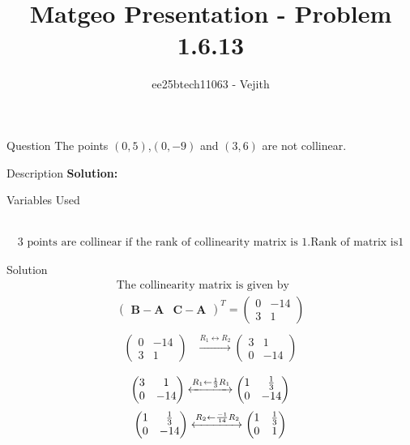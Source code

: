 \documentclass{beamer}
\title{Matgeo Presentation - Problem 1.6.13}
\author{ee25btech11063 - Vejith}
\numberwithin{equation}{section}
\providecommand{\brak}[1]{\ensuremath{\left(#1\right)}}
\theoremstyle{remark}
\newcommand{\myvec}[1]{\ensuremath{\begin{pmatrix}#1\end{pmatrix}}}
\let\vec\mathbf
\begin{document}
\frame{\titlepage}
\begin{frame}{Question}
The points $\brak{0,5}$,$\brak{0,-9}$ and $\brak{3,6}$ are  not collinear.
\end{frame}

\begin{frame}{Description}
\textbf{Solution: }\\
\begin{table}[h!]    
  \centering
  
  \caption{Variables Used}
  \label{}
\end{table}\\
\begin{align}
\text{3 points are collinear if the rank of collinearity matrix is 1.Rank of matrix is1}
\end{align}
\end{frame}

\begin{frame}{Solution}
\begin{align}
\text{The collinearity matrix is given by}\\
\myvec{
   \vec{B}-\vec{A} & \vec{C}-\vec{A}
 }^T = \myvec{
   0 & -14 
   \\
   3 & 1
   }\\
\end{align}
\begin{align}
    \myvec{
   0 & -14 
   \\
   3 & 1
   }
  &\xrightarrow{R_1 \leftrightarrow R_2}
   \myvec{
   3 & 1
   \\
   0 & -14
   }\\
 \end{align}
 \begin{align}
     \myvec{
   3 & 1
   \\
   0 & -14
   }\xleftrightarrow[]{R_1 \leftarrow {\frac{1}{3}R_1}}
   \myvec{
   1 & \frac{1}{3}
   \\
   0 & -14
   }
\end{align}
\begin{align}
    \myvec{
   1 & \frac{1}{3}
   \\
   0 & -14
   }\xleftrightarrow[]{R_2 \leftarrow {\frac{-1}{14}R_2}}
   \myvec{
   1 & \frac{1}{3}
   \\
   0 & 1
   }
\end{align}
\end{frame}
\end{document}

